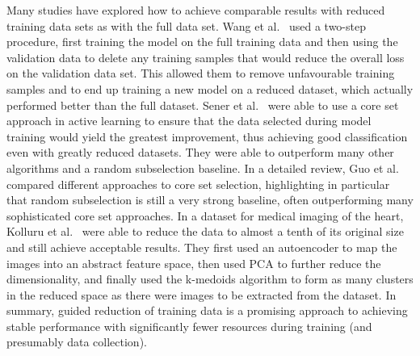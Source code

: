 Many studies have explored how to achieve comparable results with reduced training data sets as with the full data set. Wang et al.~\cite{wangDataDropoutOptimizing2018} used a two-step procedure, first training the model on the full training data and then using the validation data to delete any training samples that would reduce the overall loss on the validation data set. This allowed them to remove unfavourable training samples and to end up training a new model on a reduced dataset, which actually performed better than the full dataset. Sener et al.~\cite{senerActiveLearningConvolutional2018} were able to use a core set approach in active learning to ensure that the data selected during model training would yield the greatest improvement, thus achieving good classification even with greatly reduced datasets. They were able to outperform many other algorithms and a random subselection baseline. In a detailed review, Guo et al.~\cite{guoDeepCoreComprehensiveLibrary2022} compared different approaches to core set selection, highlighting in particular that random subselection is still a very strong baseline, often outperforming many sophisticated core set approaches. In a dataset for medical imaging of the heart, Kolluru et al.~\cite{kolluruLearningFewerImages2021} were able to reduce the data to almost a tenth of its original size and still achieve acceptable results. They first used an autoencoder to map the images into an abstract feature space, then used PCA to further reduce the dimensionality, and finally used the k-medoids algorithm to form as many clusters in the reduced space as there were images to be extracted from the dataset. In summary, guided reduction of training data is a promising approach to achieving stable performance with significantly fewer resources during training (and presumably data collection).

